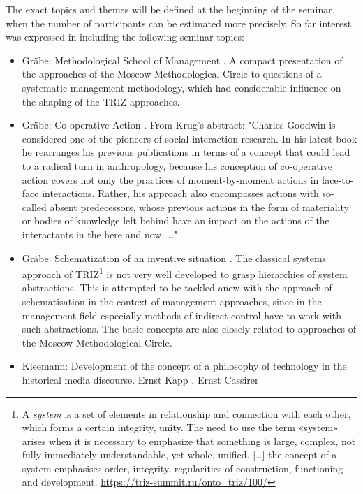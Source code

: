 \documentclass[11pt,a4paper]{article}
\begin{document}
The exact topics and themes will be defined at the beginning of the seminar,
when the number of participants can be estimated more precisely.  So far
interest was expressed in including the following seminar topics:
\begin{itemize}
\item Gr\"abe: Methodological School of Management \cite{Khristenko2014,
  Shchedrovitsky1981}.  A compact presentation of the approaches of the Moscow
  Methodological Circle to questions of a systematic management methodology,
  which had considerable influence on the shaping of the TRIZ approaches.
\item Gr\"abe: Co-operative Action \cite{Goodwin2018, Krug2019}. From Krug's
  abstract: "Charles Goodwin is considered one of the pioneers of social
  interaction research. In his latest book he rearranges his previous
  publications in terms of a concept that could lead to a radical turn in
  anthropology, because his conception of co-operative action covers not only
  the practices of moment-by-moment actions in face-to-face
  interactions. Rather, his approach also encompasses actions with so-called
  absent predecessors, whose previous actions in the form of materiality or
  bodies of knowledge left behind have an impact on the actions of the
  interactants in the here and now. \ldots"
\item Gr\"abe: Schematization of an inventive situation \cite{Kozhemyako2019}.
  The classical systems approach of TRIZ\footnote{A \emph{system} is a set of
    elements in relationship and connection with each other, which forms a
    certain integrity, unity. The need to use the term «system» arises when it
    is necessary to emphasize that something is large, complex, not fully
    immediately understandable, yet whole, unified. [\ldots] the concept of a
    system emphasises order, integrity, regularities of construction,
    functioning and development.  \url{https://triz-summit.ru/onto_triz/100/}}
  is not very well developed to grasp hierarchies of system abstractions. This
  is attempted to be tackled anew with the approach of schematisation in the
  context of management approaches, since in the management field especially
  methods of indirect control have to work with such abstractions. The basic
  concepts are also closely related to approaches of the Moscow Methodological
  Circle.
\item Kleemann: Development of the concept of a philosophy of technology in
  the historical media discourse.  Ernst Kapp \cite{Kapp1877}, Ernst Cassirer

\end{itemize}
\end{document}
